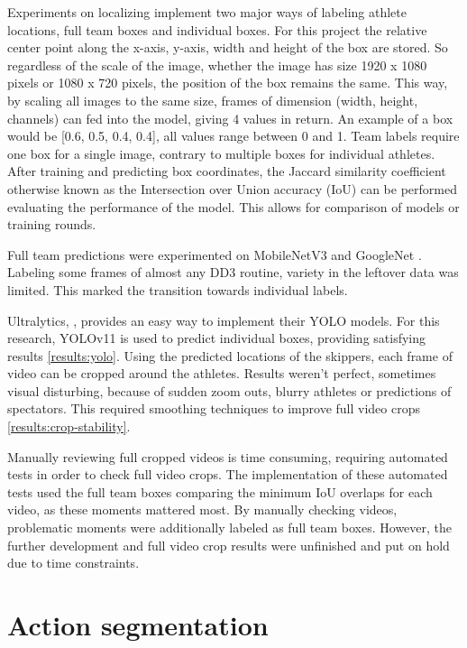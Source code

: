 Experiments on localizing implement two major ways of labeling athlete locations, full team boxes and individual boxes.
For this project the relative center point along the x-axis, y-axis, width and height of the box are stored. So regardless of the scale of the image, whether the image has size 1920 x 1080 pixels or 1080 x 720 pixels, the position of the box remains the same.
This way, by scaling all images to the same size, frames of dimension (width, height, channels) can fed into the model, giving 4 values in return. An example of a box would be [0.6, 0.5, 0.4, 0.4], all values range between 0 and 1.
Team labels require one box for a single image, contrary to multiple boxes for individual athletes.
After training and predicting box coordinates, the Jaccard similarity coefficient otherwise known as the Intersection over Union accuracy (IoU) can be performed evaluating the performance of the model. This allows for comparison of models or training rounds.

Full team predictions were experimented on MobileNetV3 \autocite{Howard2019} and GoogleNet \autocite{Szegedy2014}. Labeling some frames of almost any DD3 routine, variety in the leftover data was limited. This marked the transition towards individual labels.

Ultralytics, \autocite{Khanam2024}, provides an easy way to implement their YOLO models. For this research, YOLOv11 is used to predict individual boxes, providing satisfying results \ref{results:yolo}.
Using the predicted locations of the skippers, each frame of video can be cropped around the athletes. Results weren't perfect, sometimes visual disturbing, because of sudden zoom outs, blurry athletes or predictions of spectators. This required smoothing techniques to improve full video crops \ref{results:crop-stability}.

Manually reviewing full cropped videos is time consuming, requiring automated tests in order to check full video crops. The implementation of these automated tests used the full team boxes comparing the minimum IoU overlaps for each video, as these moments mattered most. By manually checking videos, problematic moments were additionally labeled as full team boxes. However, the further development and full video crop results were unfinished and put on hold due to time constraints.

\section{Action segmentation}
\label{methodology:action-segmentation}

